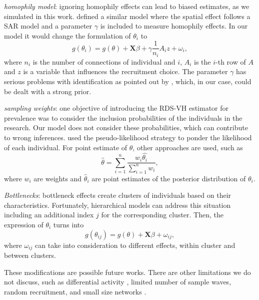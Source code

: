 \begin{alineas}
  \item {\em homophily model}: ignoring homophily effects can lead to biased 
  estimates, as we simulated in this work. \textcite[p. 9]{yauck2021general} defined a
  similar model where the spatial effect follows a SAR model and a parameter
  $\gamma$ is included to measure homophily effects. In our model it would change the
  formulation of $\theta_i$ to 
  $$
  g(\theta_i) = g(\theta) + \boldsymbol{X} \beta + \gamma\frac{1}{n_i}A_iz + \omega_i,
  $$
  where $n_i$ is the number of connections of individual and $i$, $A_i$ is the
 $i$-th row of $A$ and $z$ is a variable that influences the recruitment
 choice. The parameter $\gamma$ has
  serious problems with identification as pointed out by \textcite[p.
  11]{yauck2021general}, which, in our case, could be dealt with a strong prior.
  \item {\em sampling weights}: one objective of introducing the
  RDS-VH estimator for prevalence was to consider the inclusion
  probabilities of the individuals in the research. Our model does not
  consider these probabilities, which can contribute to wrong inferences.
  \textcite{bastos2018hiv} used the pseudo-likelihood strategy to ponder the likelihood of each
  individual. For point estimate of $\theta$, other approaches are used, such
  as 
  $$
  \hat{\theta} = \sum_{i=1}^n \frac{w_i \hat{\theta_i}}{\sum_{i=1}^n w_i},
  $$
  where $w_i$ are weights and $\hat{\theta}_i$ are point estimates of the
  posterior distribution of $\theta_i$. 
  \item {\em Bottlenecks}: bottleneck effects create clusters of individuals 
  based on their characteristics. Fortunately, hierarchical models can address
  this situation including an additional index $j$ for the corresponding
  cluster. Then, the expression of $\theta_i$ turns into
  $$
  g(\theta_{ij}) = g(\theta) + \boldsymbol{X}\beta + \omega_{ij},
  $$
  where $\omega_{ij}$ can take into consideration to different effects, within
  cluster and between clusters. 
\end{alineas}

These modifications are possible future works. There are other limitations we do not discuss, such as differential activity
\cite[p. 68]{gile2018methods}, limited number of sample waves, random
recruitment, and small size networks \cite{gile2015diagnostics}.